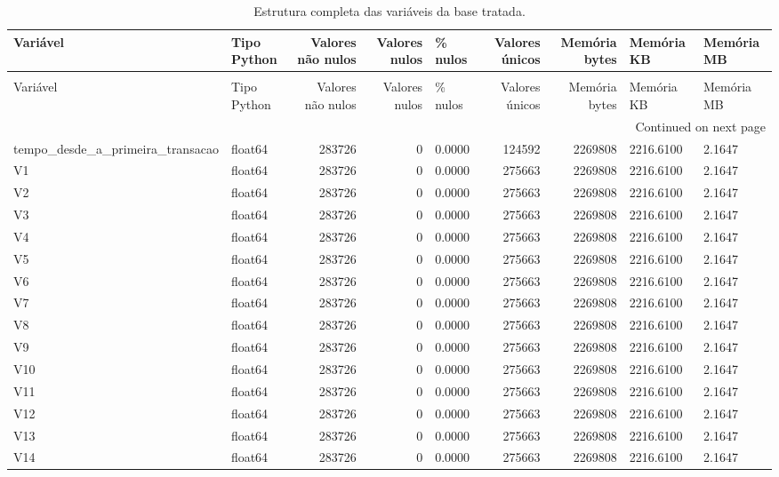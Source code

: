 \begin{longtable}{llrrlrrll}
\caption{Estrutura completa das variáveis da base tratada.} \label{tab:estrutura-variaveis} \\
\toprule
Variável & Tipo Python & Valores não nulos & Valores nulos & \% nulos & Valores únicos & Memória bytes & Memória KB & Memória MB \\
\midrule
\endfirsthead
\caption[]{Estrutura completa das variáveis da base tratada.} \\
\toprule
Variável & Tipo Python & Valores não nulos & Valores nulos & \% nulos & Valores únicos & Memória bytes & Memória KB & Memória MB \\
\midrule
\endhead
\midrule
\multicolumn{9}{r}{Continued on next page} \\
\midrule
\endfoot
\bottomrule
\endlastfoot
tempo\_desde\_a\_primeira\_transacao & float64 & 283726 & 0 & 0.0000 & 124592 & 2269808 & 2216.6100 & 2.1647 \\
V1 & float64 & 283726 & 0 & 0.0000 & 275663 & 2269808 & 2216.6100 & 2.1647 \\
V2 & float64 & 283726 & 0 & 0.0000 & 275663 & 2269808 & 2216.6100 & 2.1647 \\
V3 & float64 & 283726 & 0 & 0.0000 & 275663 & 2269808 & 2216.6100 & 2.1647 \\
V4 & float64 & 283726 & 0 & 0.0000 & 275663 & 2269808 & 2216.6100 & 2.1647 \\
V5 & float64 & 283726 & 0 & 0.0000 & 275663 & 2269808 & 2216.6100 & 2.1647 \\
V6 & float64 & 283726 & 0 & 0.0000 & 275663 & 2269808 & 2216.6100 & 2.1647 \\
V7 & float64 & 283726 & 0 & 0.0000 & 275663 & 2269808 & 2216.6100 & 2.1647 \\
V8 & float64 & 283726 & 0 & 0.0000 & 275663 & 2269808 & 2216.6100 & 2.1647 \\
V9 & float64 & 283726 & 0 & 0.0000 & 275663 & 2269808 & 2216.6100 & 2.1647 \\
V10 & float64 & 283726 & 0 & 0.0000 & 275663 & 2269808 & 2216.6100 & 2.1647 \\
V11 & float64 & 283726 & 0 & 0.0000 & 275663 & 2269808 & 2216.6100 & 2.1647 \\
V12 & float64 & 283726 & 0 & 0.0000 & 275663 & 2269808 & 2216.6100 & 2.1647 \\
V13 & float64 & 283726 & 0 & 0.0000 & 275663 & 2269808 & 2216.6100 & 2.1647 \\
V14 & float64 & 283726 & 0 & 0.0000 & 275663 & 2269808 & 2216.6100 & 2.1647 \\

\end{longtable}
